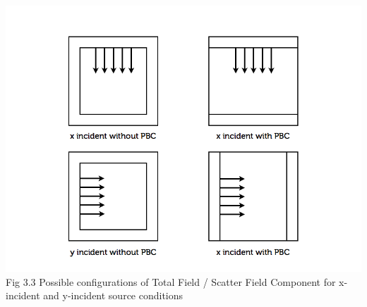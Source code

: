 \documentclass[openany]{book}
\begin{document}
\begin{center}
\includegraphics[scale=0.5]{images/tfsf-pbc.jpg}\\
Fig 3.3
Possible configurations of Total Field / Scatter Field Component for x-incident and y-incident source conditions
\end{center}
\end{document}
